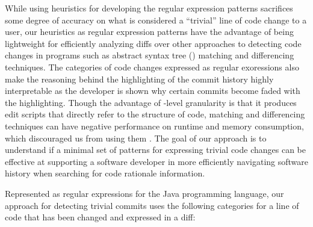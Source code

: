 While using heuristics for developing the regular expression patterns sacrifices some degree of accuracy on what is considered a ``trivial'' line of code change to a user,
our heuristics as regular expression patterns have the advantage of being lightweight for efficiently analyzing diffs over other approaches to detecting code changes in programs such as abstract syntax tree () matching and differencing techniques.
The categories of code changes expressed as regular exoressions also make the reasoning behind the highlighting of the commit history highly interpretable as the developer is shown why certain commits become faded with the highlighting.
Though the advantage of -level granularity is that it produces edit scripts that directly refer to the structure of code,  matching and differencing techniques can have negative performance on runtime and memory consumption, which discouraged us from using them \cite{fluri_change_2007,pawlik_RTED_2011,falleri_fine-grained_2014}.
The goal of our approach is to understand if a minimal set of patterns for expressing trivial code changes can be effective at supporting a software developer in more efficiently navigating software history when searching for code rationale information.

Represented as regular expressions for the Java programming language, our approach for detecting trivial commits uses the following categories for a line of code that has been changed and expressed in a diff: 


